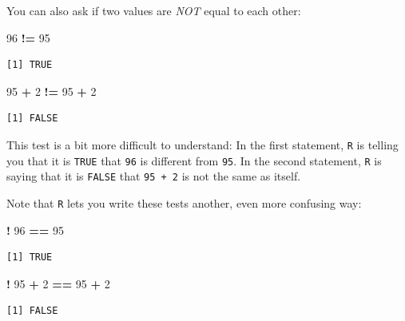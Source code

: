 \documentclass[
]{book}
\newenvironment{Shaded}{\begin{snugshade}}{\end{snugshade}}
\newcommand{\DecValTok}[1]{\textcolor[rgb]{0.00,0.00,0.81}{#1}}
\newcommand{\OperatorTok}[1]{\textcolor[rgb]{0.81,0.36,0.00}{\textbf{#1}}}
\newcommand{\StringTok}[1]{\textcolor[rgb]{0.31,0.60,0.02}{#1}}
\begin{document}
You can also ask if two values are \emph{NOT} equal to each other:

\begin{Shaded}
\begin{Highlighting}[]
\DecValTok{96} \OperatorTok{!=}\StringTok{ }\DecValTok{95}
\end{Highlighting}
\end{Shaded}

\begin{verbatim}
[1] TRUE
\end{verbatim}

\begin{Shaded}
\begin{Highlighting}[]
\DecValTok{95} \OperatorTok{+}\StringTok{ }\DecValTok{2} \OperatorTok{!=}\StringTok{ }\DecValTok{95} \OperatorTok{+}\StringTok{ }\DecValTok{2}
\end{Highlighting}
\end{Shaded}

\begin{verbatim}
[1] FALSE
\end{verbatim}

This test is a bit more difficult to understand: In the first statement, \texttt{R} is telling you that it is \texttt{TRUE} that \texttt{96} is different from \texttt{95}. In the second statement, \texttt{R} is saying that it is \texttt{FALSE} that \texttt{95\ +\ 2} is not the same as itself.

Note that \texttt{R} lets you write these tests another, even more confusing way:

\begin{Shaded}
\begin{Highlighting}[]
\OperatorTok{!}\StringTok{ }\DecValTok{96} \OperatorTok{==}\StringTok{ }\DecValTok{95}
\end{Highlighting}
\end{Shaded}

\begin{verbatim}
[1] TRUE
\end{verbatim}

\begin{Shaded}
\begin{Highlighting}[]
\OperatorTok{!}\StringTok{ }\DecValTok{95} \OperatorTok{+}\StringTok{ }\DecValTok{2} \OperatorTok{==}\StringTok{ }\DecValTok{95} \OperatorTok{+}\StringTok{ }\DecValTok{2}
\end{Highlighting}
\end{Shaded}

\begin{verbatim}
[1] FALSE
\end{verbatim}
\end{document}
